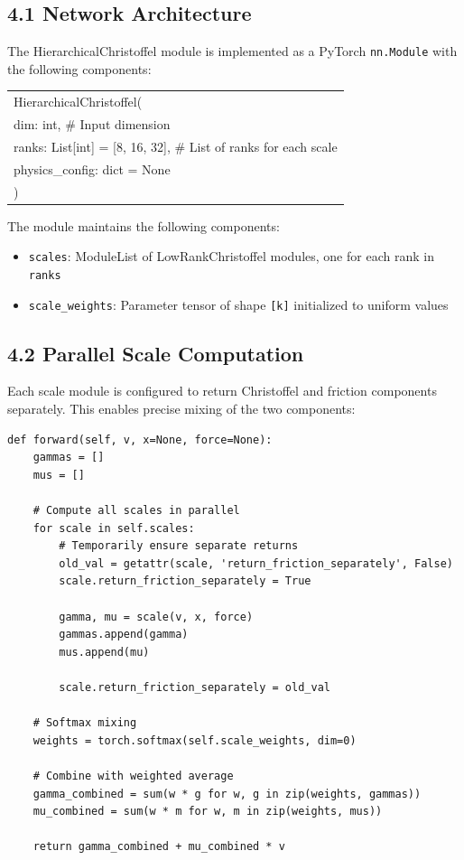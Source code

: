 \documentclass[12pt]{article}
\begin{document}
\subsection{4.1 Network Architecture}

The HierarchicalChristoffel module is implemented as a PyTorch \texttt{nn.Module} with the following components:

\begin{center}
\begin{tabular}{|l|}
\hline
HierarchicalChristoffel( \\
\quad dim: int,                 \# Input dimension \\
\quad ranks: List[int] = [8, 16, 32],  \# List of ranks for each scale \\
\quad physics\_config: dict = None \\
) \\
\hline
\end{tabular}
\end{center}

The module maintains the following components:
\begin{itemize}
\item \texttt{scales}: ModuleList of LowRankChristoffel modules, one for each rank in \texttt{ranks}
\item \texttt{scale\_weights}: Parameter tensor of shape \texttt{[k]} initialized to uniform values
\end{itemize}

\subsection{4.2 Parallel Scale Computation}

Each scale module is configured to return Christoffel and friction components separately. This enables precise mixing of the two components:

\begin{lstlisting}[style=pystyle]
def forward(self, v, x=None, force=None):
    gammas = []
    mus = []
    
    # Compute all scales in parallel
    for scale in self.scales:
        # Temporarily ensure separate returns
        old_val = getattr(scale, 'return_friction_separately', False)
        scale.return_friction_separately = True
        
        gamma, mu = scale(v, x, force)
        gammas.append(gamma)
        mus.append(mu)
        
        scale.return_friction_separately = old_val
    
    # Softmax mixing
    weights = torch.softmax(self.scale_weights, dim=0)
    
    # Combine with weighted average
    gamma_combined = sum(w * g for w, g in zip(weights, gammas))
    mu_combined = sum(w * m for w, m in zip(weights, mus))
    
    return gamma_combined + mu_combined * v
\end{lstlisting}
\end{document}
